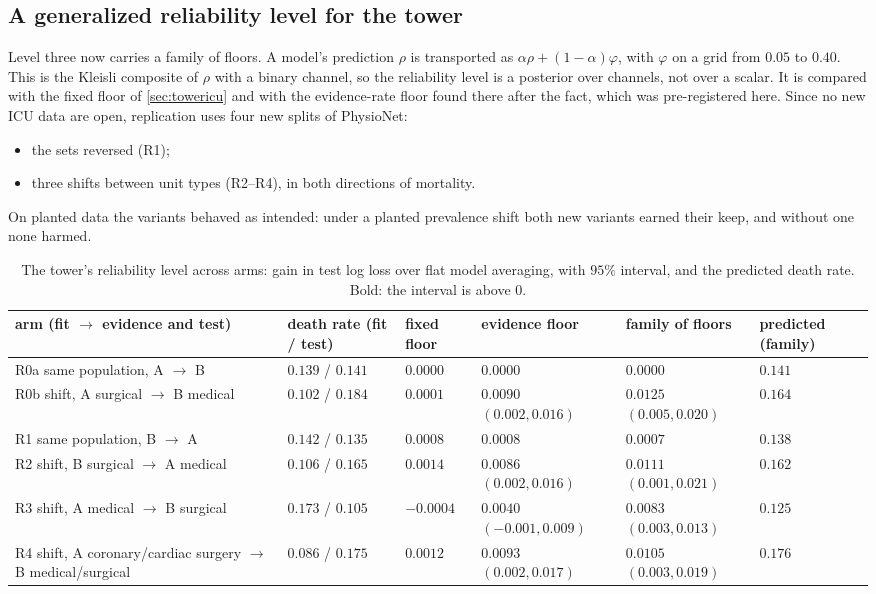 \documentclass[11pt]{article}
\theoremstyle{definition}
\theoremstyle{remark}
\begin{document}
\subsection{A generalized reliability level for the tower}\label{sec:gentower}

Level three now carries a family of floors. A model's prediction $\rho$ is transported as $\alpha\rho+(1-\alpha)\varphi$, with $\varphi$
on a grid from $0.05$ to $0.40$. This is the Kleisli composite of $\rho$ with a binary channel, so the reliability level is a posterior
over channels, not over a scalar. It is compared with the fixed floor of \cref{sec:towericu} and with the evidence-rate floor found there
after the fact, which was pre-registered here. Since no new ICU data are open, replication uses four new splits of PhysioNet:
\begin{itemize}[leftmargin=*,nosep]
\item the sets reversed (R1);
\item three shifts between unit types (R2--R4), in both directions of mortality.
\end{itemize}
On planted data the variants behaved as intended: under a planted prevalence shift both new variants earned their keep, and without one
none harmed.

\begin{table}[!htbp]
\centering\footnotesize
\caption{The tower's reliability level across arms: gain in test log loss over flat model averaging, with $95\%$ interval, and the
predicted death rate. Bold: the interval is above $0$.}\label{tab:gentower}
\setlength{\tabcolsep}{2.5pt}
\begin{tabular}{>{\raggedright}p{4.1cm}>{\centering}p{1.6cm}>{\centering}p{1.2cm}>{\centering}p{2.5cm}>{\centering}p{2.5cm}>{\centering\arraybackslash}p{1.4cm}}
\toprule
arm (fit $\to$ evidence and test) & death rate (fit / test) & fixed floor & evidence floor & family of floors & predicted (family)\\
\midrule
R0a same population, A $\to$ B & $0.139$ / $0.141$ & $0.0000$ & $0.0000$ & $0.0000$ & $0.141$\\
R0b shift, A surgical $\to$ B medical & $0.102$ / $0.184$ & $0.0001$ & $\mathbf{0.0090}$ $(0.002, 0.016)$ & $\mathbf{0.0125}$ $(0.005, 0.020)$ & $0.164$\\
R1 same population, B $\to$ A & $0.142$ / $0.135$ & $0.0008$ & $0.0008$ & $0.0007$ & $0.138$\\
R2 shift, B surgical $\to$ A medical & $0.106$ / $0.165$ & $0.0014$ & $\mathbf{0.0086}$ $(0.002, 0.016)$ & $\mathbf{0.0111}$ $(0.001, 0.021)$ & $0.162$\\
R3 shift, A medical $\to$ B surgical & $0.173$ / $0.105$ & $-0.0004$ & $0.0040$ $(-0.001, 0.009)$ & $\mathbf{0.0083}$ $(0.003, 0.013)$ & $0.125$\\
R4 shift, A coronary/cardiac surgery $\to$ B medical/surgical & $0.086$ / $0.175$ & $0.0012$ & $\mathbf{0.0093}$ $(0.002, 0.017)$ & $\mathbf{0.0105}$ $(0.003, 0.019)$ & $0.176$\\
\bottomrule
\end{tabular}
\end{table}
\end{document}

